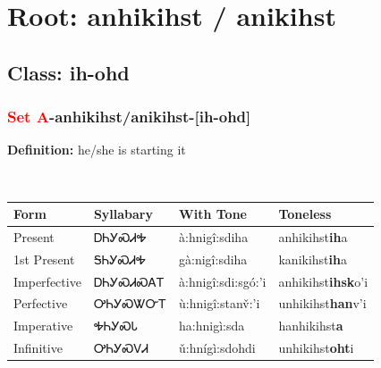 \needspace{4in}
\section*{Root: anhikihst / anikihst}
\nopagebreak
{}
\needspace{3in}
\subsection*{Class: ih-ohd}
\nopagebreak
\needspace{2in}
\subsubsection*{\textcolor{Red}{Set A}{-}\textbf{anhikihst/anikihst}{-}[ih-ohd]}
\nopagebreak
\textbf{Definition: } he/she is starting it
\\[0.5em]
\begin{tabularx}{\textwidth}{l X X X}%
\toprule%
\textbf{Form}&\textbf{Syllabary}&\textbf{With Tone}&\textbf{Toneless}\\%
\midrule%
Present&ᎠᏂᎩᏍᏗᎭ&à:hnigî:sdiha&anhikihst\textbf{ih}a\\%
1st Present&ᎦᏂᎩᏍᏗᎭ&gà:nigî:sdiha&kanikihst\textbf{ih}a\\%
Imperfective&ᎠᏂᎩᏍᏗᏍᎪᎢ&à:hnigî:sdi:sgó:’i&anhikihst\textbf{ihsk}o'i\\%
Perfective&ᎤᏂᎩᏍᏔᏅᎢ&ù:hnigî:stanv̌:’i&unhikihst\textbf{han}v'i\\%
Imperative&ᎭᏂᎩᏍᏓ&ha:hnigì:sda&hanhikihst\textbf{a}\\%
Infinitive&ᎤᏂᎩᏍᏙᏗ&ǔ:hnígì:sdohdi&unhikihst\textbf{oht}i\\%
\bottomrule%
\end{tabularx}
\\[1em]